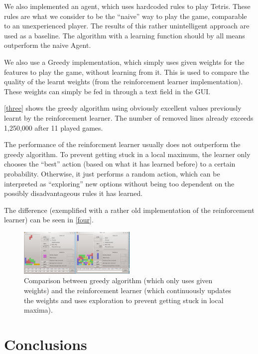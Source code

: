 \documentclass{ml}
\begin{document}
We also implemented an agent, which uses hardcoded rules to play Tetris. 
These rules are what we consider to be the ``naive'' way to play the game, comparable to an unexperienced player. 
The results of this rather unintelligent approach are used as a baseline. 
The algorithm with a learning function should by all means outperform the naive Agent.

We also use a Greedy implementation, which simply uses given weights for the features to play the game, without learning from it. 
This is used to compare the quality of the learnt weights (from the reinforcement learner implementation). 
These weights can simply be fed in through a text field in the GUI. 

\autoref{three} shows the greedy algorithm using obviously excellent values previously learnt by the reinforcement learner.
The number of removed lines already exceeds 1,250,000 after 11 played games. 

The performance of the reinforcment learner usually does not outperform the greedy algorithm. 
To prevent getting stuck in a local maximum, the learner only chooses the ``best'' action (based on what it has learned before) to a certain probability. 
Otherwise, it just performs a random action, which can be interpreted as ``exploring'' new options without being too dependent on the possibly disadvantageous rules it has learned. 

The difference (exemplified with a rather old implementation of the reinforcement learner) can be seen in \autoref{four}.


\begin{figure}
\vspace{-10pt}
  \begin{center}
    \includegraphics[width=0.5\textwidth]{img/four.png}
  \end{center}
  \vspace{-10pt}
  \caption{\small{Comparison between greedy algorithm (which only uses given weights) and the reinforcement learner (which continuously updates the weights and uses exploration to prevent getting stuck in local maxima).}}
  \label{four}
  \vspace{-10pt}
\end{figure}




\section{Conclusions}
\label{conclusions}



\newpage


\end{document}
